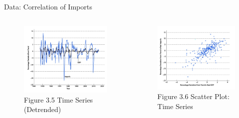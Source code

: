 \documentclass[11pt,aspectratio=169,usenames,dvipsnames]{beamer}
\begin{document}
\begin{frame}{Data: Correlation of Imports}
\label{slide:Data__Correlation_of_Imports}
    \begin{columns}
        \begin{column}{0.5\textwidth}
            \begin{figure}
                \caption{Figure 3.5  Time Series (Detrended)}
                \includegraphics[width=\textwidth]{./figures/Figure3_5.jpg}
            \end{figure}
        \end{column}
        \begin{column}{0.5\textwidth}
            \begin{figure}
                \caption{Figure 3.6  Scatter Plot: Time Series}
                \includegraphics[width=\textwidth]{./figures/Figure3_6.jpg}
            \end{figure}
        \end{column}
    \end{columns}
\end{frame}
\end{document}
